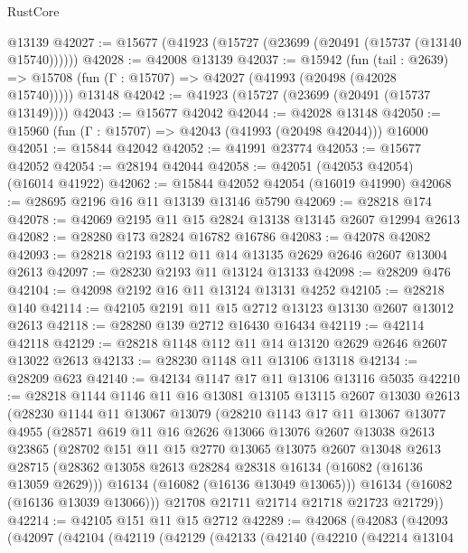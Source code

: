 \begin{lexlean}{RustCore}
\begin{coremodule}
    @13139
@42027 := @15677 (@41923 (@15727 (@23699 (@20491 (@15737 (@13140 @15740))))))
@42028 := @42008 @13139
@42037 := @15942
    (fun (tail : @2639) => @15708 (fun (Γ : @15707) => @42027 (@41993 (@20498 (@42028 @15740)))))
    @13148
@42042 := @41923 (@15727 (@23699 (@20491 (@15737 @13149))))
@42043 := @15677 @42042
@42044 := @42028 @13148
@42050 := @15960 (fun (Γ : @15707) => @42043 (@41993 (@20498 @42044))) @16000
@42051 := @15844 @42042
@42052 := @41991 @23774
@42053 := @15677 @42052
@42054 := @28194 @42044
@42058 := @42051 (@42053 @42054) (@16014 @41922)
@42062 := @15844 @42052 @42054 (@16019 @41990)
@42068 := @28695 @2196 @16 @11 @13139 @13146 @5790
@42069 := @28218 @174
@42078 := @42069 @2195 @11 @15 @2824 @13138 @13145 @2607 @12994 @2613
@42082 := @28280 @173 @2824 @16782 @16786
@42083 := @42078 @42082
@42093 := @28218 @2193 @112 @11 @14 @13135 @2629 @2646 @2607 @13004 @2613
@42097 := @28230 @2193 @11 @13124 @13133
@42098 := @28209 @476
@42104 := @42098 @2192 @16 @11 @13124 @13131 @4252
@42105 := @28218 @140
@42114 := @42105 @2191 @11 @15 @2712 @13123 @13130 @2607 @13012 @2613
@42118 := @28280 @139 @2712 @16430 @16434
@42119 := @42114 @42118
@42129 := @28218 @1148 @112 @11 @14 @13120 @2629 @2646 @2607 @13022 @2613
@42133 := @28230 @1148 @11 @13106 @13118
@42134 := @28209 @623
@42140 := @42134 @1147 @17 @11 @13106 @13116 @5035
@42210 := @28218
    @1144
    @1146
    @11
    @16
    @13081
    @13105
    @13115
    @2607
    @13030
    @2613
    (@28230
      @1144
      @11
      @13067
      @13079
      (@28210
        @1143
        @17
        @11
        @13067
        @13077
        @4955
        (@28571
          @619
          @11
          @16
          @2626
          @13066
          @13076
          @2607
          @13038
          @2613
          @23865
          (@28702
            @151
            @11
            @15
            @2770
            @13065
            @13075
            @2607
            @13048
            @2613
            @28715
            (@28362 @13058 @2613 @28284 @28318 @16134 (@16082 (@16136 @13059 @2629)))
            @16134
            (@16082 (@16136 @13049 @13065)))
          @16134
          (@16082 (@16136 @13039 @13066)))
        @21708
        @21711
        @21714
        @21718
        @21723
        @21729))
@42214 := @42105 @151 @11 @15 @2712
@42289 := @42068
    (@42083
      (@42093
        (@42097
          (@42104
            (@42119
              (@42129
                (@42133
                  (@42140
                    (@42210
                      (@42214
                        @13104

\end{coremodule}
\end{lexlean}
